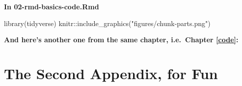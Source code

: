 \documentclass[a4paper, twoside]{templates/ociamthesis}
\newenvironment{Shaded}{\begin{snugshade}}{\end{snugshade}}
\newcommand{\FunctionTok}[1]{\textcolor[rgb]{0.00,0.00,0.00}{#1}}
\newcommand{\NormalTok}[1]{#1}
\newcommand{\SpecialCharTok}[1]{\textcolor[rgb]{0.00,0.00,0.00}{#1}}
\newcommand{\StringTok}[1]{\textcolor[rgb]{0.31,0.60,0.02}{#1}}
\renewenvironment{Shaded}
{
  \vspace{4pt}%
  \begin{snugshade}%
}{%
  \end{snugshade}%
  \vspace{4pt}%
}
\newcommand*{\bibtitle}{Works Cited}
\begin{document}
\textbf{In 02-rmd-basics-code.Rmd}

\begin{Shaded}
\begin{Highlighting}[]
\FunctionTok{library}\NormalTok{(tidyverse)}
\NormalTok{knitr}\SpecialCharTok{::}\FunctionTok{include\_graphics}\NormalTok{(}\StringTok{"figures/chunk{-}parts.png"}\NormalTok{)}
\end{Highlighting}
\end{Shaded}

\textbf{And here's another one from the same chapter, i.e.~Chapter \ref{code}:}

\hypertarget{the-second-appendix-for-fun}{%
\chapter{The Second Appendix, for Fun}\label{the-second-appendix-for-fun}}




\setlength{\baselineskip}{0pt} %

{\renewcommand*\MakeUppercase[1]{#1}%
\printbibliography[heading=bibintoc,title={\bibtitle}]}
\end{document}

